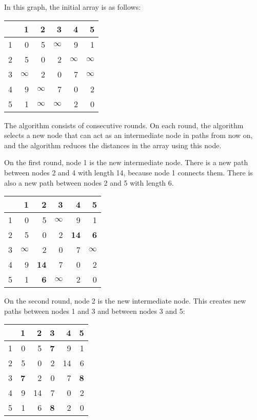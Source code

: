 In this graph, the initial array is as follows:
\begin{center}
\begin{tabular}{r|rrrrr}
 & 1 & 2 & 3 & 4 & 5 \\
\hline
1 & 0 & 5 & $\infty$ & 9 & 1 \\
2 & 5 & 0 & 2 & $\infty$ & $\infty$ \\
3 & $\infty$ & 2 & 0 & 7 & $\infty$ \\
4 & 9 & $\infty$ & 7 & 0 & 2 \\
5 & 1 & $\infty$ & $\infty$ & 2 & 0 \\
\end{tabular}
\end{center}
\vspace{10pt}
The algorithm consists of consecutive rounds.
On each round, the algorithm selects a new node
that can act as an intermediate node in paths from now on,
and the algorithm reduces the distances in the array
using this node.

On the first round, node 1 is the new intermediate node.
There is a new path between nodes 2 and 4
with length 14, because node 1 connects them.
There is also a new path 
between nodes 2 and 5 with length 6.

\begin{center}
\begin{tabular}{r|rrrrr}
 & 1 & 2 & 3 & 4 & 5 \\
\hline
1 & 0 & 5 & $\infty$ & 9 & 1 \\
2 & 5 & 0 & 2 & \textbf{14} & \textbf{6} \\
3 & $\infty$ & 2 & 0 & 7 & $\infty$ \\
4 & 9 & \textbf{14} & 7 & 0 & 2 \\
5 & 1 & \textbf{6} & $\infty$ & 2 & 0 \\
\end{tabular}
\end{center}
\vspace{10pt}

On the second round, node 2 is the new intermediate node.
This creates new paths between nodes 1 and 3
and between nodes 3 and 5:

\begin{center}
\begin{tabular}{r|rrrrr}
 & 1 & 2 & 3 & 4 & 5 \\
\hline
1 & 0 & 5 & \textbf{7} & 9 & 1 \\
2 & 5 & 0 & 2 & 14 & 6 \\
3 & \textbf{7} & 2 & 0 & 7 & \textbf{8} \\
4 & 9 & 14 & 7 & 0 & 2 \\
5 & 1 & 6 & \textbf{8} & 2 & 0 \\
\end{tabular}
\end{center}
\vspace{10pt}

